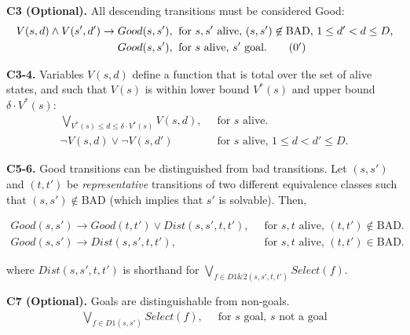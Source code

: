 \documentclass[a4paper]{article}
\newcommand{\smallpar}[1]{{\vspace{10pt}\noindent \bf #1.}}
\newcommand{\badtx}{\ensuremath{\mathrm{BAD}}}
\begin{document}
\smallpar{C3 (Optional)} All descending transitions must be considered Good:
\begin{align}
 V(s, d) \land V(s', d') \rightarrow Good(s, s'),&\;\; \text{for $s, s'$ alive, $(s, s') \not\in \badtx$, $1 \leq d' < d \leq D$,} \\
 Good(s, s'),&\;\; \text{for $s$ alive, $s'$ goal.} \tag{\theequation${}^\prime$}
\end{align}


\smallpar{C3-4}
Variables $V(s, d)$ define a function that is total over the set of alive states,
and such that $V(s)$ is within lower bound $V^*(s)$ and upper bound $\delta \cdot V^*(s)$:
\begin{align}
 \bigvee_{V^*(s) \leq d \leq \delta \cdot V^*(s)} V(s,d),&\;\; \text{for $s$ alive.} \\
 \neg V(s, d) \lor \neg V(s, d')&\;\; \text{for $s$ alive, $1 \leq d < d' \leq D$.}
\end{align}


\smallpar{C5-6}
Good transitions can be distinguished from bad transitions.
Let $(s, s')$ and $(t, t')$ be \emph{representative} transitions
of two different equivalence classes such that $(s, s') \not\in \badtx$
(which implies that $s'$ is solvable). Then,

\begin{align}
 Good(s, s') \rightarrow Good(t, t') \lor
 Dist(s, s', t, t'),&\;\; \text{for $s, t$ alive, $(t, t') \not\in \badtx$.} \\
 Good(s, s') \rightarrow
 Dist(s, s', t, t'),&\;\; \text{for $s, t$ alive, $(t, t') \in \badtx$.}
\end{align}

\noindent where $Dist(s, s', t, t')$ is shorthand for $\bigvee_{f \in D1\&2(s, s', t, t')} Select(f)$.


\smallpar{C7 (Optional)}
Goals are distinguishable from non-goals.
\begin{align}
\bigvee_{f \in D1(s, s')} Select(f),&\;\; \text{for $s$ goal, $s$ not a goal}
\end{align}
\end{document}
